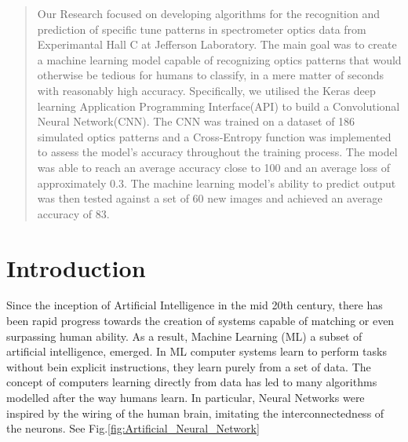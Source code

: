 \documentclass[conference]{IEEEtran}
\begin{document}
\begin{abstract}
Our Research focused on developing algorithms for the recognition and prediction of specific tune patterns in spectrometer optics data from Experimantal Hall C at Jefferson Laboratory. The main goal was to create a machine learning model capable of recognizing optics patterns that would otherwise be tedious for humans to classify, in a mere matter of seconds with reasonably high accuracy. Specifically, we utilised the Keras deep learning Application Programming Interface(API) to build a Convolutional Neural Network(CNN). The CNN was trained on a dataset of 186 simulated optics patterns and a Cross-Entropy function was implemented to assess the model's accuracy throughout the training process. The model was able to reach an average accuracy close to 100\text{\%} and an average loss of approximately 0.3. The machine learning model's ability to predict output was then tested against a set of 60 new images and achieved an average accuracy of 83\text{\%}.  
\end{abstract}


\section{Introduction}
Since the inception of Artificial Intelligence in the mid 20th century, there has been rapid progress towards the creation of systems capable of matching or even surpassing human ability. As a result, Machine Learning (ML) a subset of artificial intelligence, emerged. In ML computer systems learn to perform tasks without bein explicit instructions, they learn purely from a set of data. The concept of computers learning directly from data has led to many algorithms modelled after the way humans learn. In particular, Neural Networks were inspired by the wiring of the human brain, imitating the interconnectedness of the neurons.
 See Fig.\ref{fig:Artificial_Neural_Network}
\cite{Artificial_Neural_Network}
\end{document}
